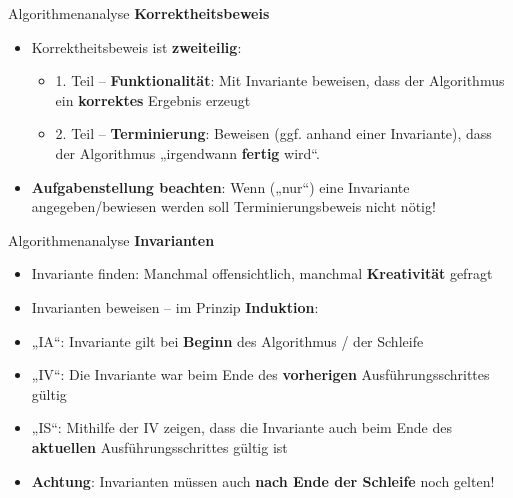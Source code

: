 \begin{frame}{Algorithmenanalyse}
	\textbf{Korrektheitsbeweis} \\
	
	\begin{itemize}
		\item Korrektheitsbeweis ist \textbf{zweiteilig}:
		
		\begin{itemize}
			\item 1. Teil -- \textbf{Funktionalität}: Mit Invariante beweisen, dass der Algorithmus ein \textbf{korrektes} Ergebnis erzeugt
			
			\item 2. Teil -- \textbf{Terminierung}: Beweisen (ggf. anhand einer Invariante), dass der Algorithmus „irgendwann \textbf{fertig} wird“.
		\end{itemize}
		
		\item \textbf{Aufgabenstellung beachten}: Wenn („nur“) eine Invariante angegeben/bewiesen werden soll \impl Terminierungsbeweis nicht nötig!
	\end{itemize}
\end{frame}

\begin{frame}{Algorithmenanalyse}
	\textbf{Invarianten} \\
	
	\begin{itemize}
		\item Invariante finden: Manchmal offensichtlich, manchmal \textbf{Kreativität} gefragt
		
		\item Invarianten beweisen – im Prinzip \textbf{Induktion}:
		
		\item „IA“: Invariante gilt bei \textbf{Beginn} des Algorithmus / der Schleife
		
		\item „IV“: Die Invariante war beim Ende des \textbf{vorherigen} Ausführungsschrittes gültig
		
		\item „IS“: Mithilfe der IV zeigen, dass die Invariante auch beim Ende des \textbf{aktuellen} Ausführungsschrittes gültig ist
		\item \textbf{Achtung}: Invarianten müssen auch \textbf{nach Ende der Schleife} noch gelten!
	\end{itemize}
\end{frame}

